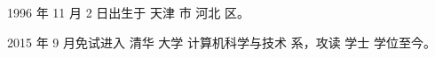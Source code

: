 \begin{resume}


  1996 年 11 月 2 日出生于 天津 市 河北 区。

  2015 年 9 月免试进入 清华 大学 计算机科学与技术 系，攻读 学士 学位至今。

\end{resume}

